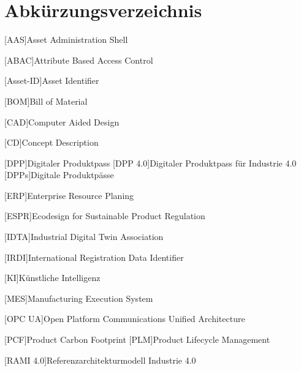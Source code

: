 \section*{Abkürzungsverzeichnis}
\begin{singlespacing}
\end{singlespacing}
\begin{acronym}

[AAS]{Asset Administration Shell}

[ABAC]{Attribute Based Access Control}

[Asset-ID]{Asset Identifier}

[BOM]{Bill of Material}

[CAD]{Computer Aided Design}

[CD]{Concept Description}

[DPP]{Digitaler Produktpass}
[DPP 4.0]{Digitaler Produktpass für Industrie 4.0}
[DPPs]{Digitale Produktpässe}

[ERP]{Enterprise Resource Planing}

[ESPR]{Ecodesign for Sustainable Product Regulation}

[IDTA]{Industrial Digital Twin Association}

[IRDI]{International Registration Data Identifier}

[KI]{Künstliche Intelligenz}

[MES]{Manufacturing Execution System}

[OPC UA]{Open Platform Communications Unified Architecture}

[PCF]{Product Carbon Footprint}
[PLM]{Product Lifecycle Management}

[RAMI 4.0]{Referenzarchitekturmodell Industrie 4.0}

\end{acronym}



\newpage